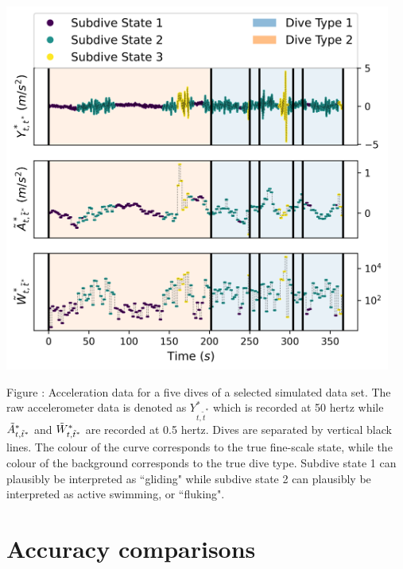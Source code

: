\documentclass{article}
\begin{document}
        \begin{center}
    	\includegraphics[width=5in]{../Plots/sim_data.png}
    	\end{center}
    	
    	\noindent Figure : Acceleration data for a five dives of a selected simulated data set. The raw accelerometer data is denoted as $Y^*_{t,\tilde t^*}$ which is recorded at 50 hertz while $\tilde{A}^*_{t,\tilde t^*}$ and $\tilde{W}^*_{t,\tilde t^*}$ are recorded at 0.5 hertz. Dives are separated by vertical black lines. The colour of the curve corresponds to the true fine-scale state, while the colour of the background corresponds to the true dive type. Subdive state 1 can plausibly be interpreted as ``gliding" while subdive state 2 can plausibly be interpreted as active swimming, or ``fluking".
    	\addtocounter{fignum}{1}

    \newpage
    \section{Accuracy comparisons}
        
\end{document}
